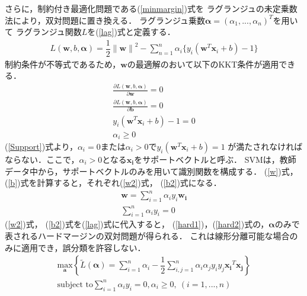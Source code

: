 さらに，制約付き最適化問題である(\ref{minmargin})式を
ラグランジュの未定乗数法により，双対問題に置き換える．
ラグランジュ乗数$\boldsymbol{\alpha} = (\alpha_1,...,\alpha_n)^T$を用いて
ラグランジュ関数$L$を(\ref{lag})式と定義する．
\begin{align}
    \label{lag}
    L(\boldsymbol{w},b,\boldsymbol{\alpha}) 
    = \dfrac{1}{2}{\|\boldsymbol{{w}}\|}^2
    - \sum_{n = 1}^{n} \alpha_i \{y_i(\boldsymbol{w}^T \boldsymbol{x}_i + b)-1\}
\end{align}
制約条件が不等式であるため，$\boldsymbol{w}$の最適解のおいて以下のKKT条件が適用できる．
\begin{subequations}
\begin{align}
   \frac{\partial L(\boldsymbol{w},b,\boldsymbol{\alpha})}{\partial \boldsymbol{w}} = 0\label{w}\\
    \frac{\partial L(\boldsymbol{w},b,\boldsymbol{\alpha})}{\partial \boldsymbol{b}} = 0\label{b}\\
    y_i(\boldsymbol{w}^T \boldsymbol{x}_i + b)-1 = 0\label{Support}\\
    \alpha_i \geq 0
\end{align}
\end{subequations}
(\ref{Support})式より，$\alpha_i = 0$または$\alpha_i > 0$で$y_i(\boldsymbol{w}^T \boldsymbol{x}_i + b)=1$
が満たされなければならない．ここで，$\alpha_i > 0$となる$\boldsymbol{x_i}$をサポートベクトルと呼ぶ．
SVMは，教師データ中から，サポートベクトルのみを用いて識別関数を構成する．
 (\ref{w})式， (\ref{b})式を計算すると，それぞれ(\ref{w2})式， (\ref{b2})式になる．
 \begin{subequations}
 \begin{align}
   \boldsymbol{w} = \sum_{i=1}^{n}\alpha_i y_i \boldsymbol{w_i} \label{w2}\\
   \sum_{i=1}^{n}\alpha_i y_i = 0 \label{b2}
 \end{align}
\end{subequations}
(\ref{w2})式， (\ref{b2})式を(\ref{lag})式に代入すると，
(\ref{hard1})，(\ref{hard2})式の，$\boldsymbol{\alpha}$のみで表されるハードマージンの双対問題が得られる．
これは線形分離可能な場合のみに適用でき，誤分類を許容しない．
\begin{subequations}
\begin{align}
    \underset{\boldsymbol{a}}{\text{max}} \left\{\tilde{L}(\boldsymbol{\alpha}) 
    = \sum_{i=1}^{n}\alpha_i - \dfrac{1}{2}\sum_{i,j=1}^{n}\label{hard1}
    \alpha_i\alpha_j y_i y_j \boldsymbol{x_i}^T \boldsymbol{x_j}\right\}  \\
    \text{subject to} \sum_{i=1}^{n}\alpha_i y_i = 0, \alpha_i \geq 0,\ (i=1,...,n)\label{hard2}
\end{align}
\end{subequations}
